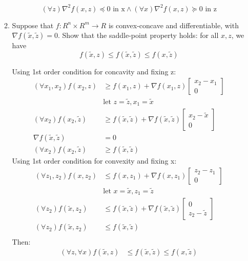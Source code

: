 \documentclass[12pt,letter]{article}
\begin{document}
\begin{enumerate}
\begin{enumerate}
    \[ (\forall z) \nabla^2 f(x,z) \preceq 0 \text{ in x} \wedge (\forall x) \nabla^2 f(x,z) \succeq 0 \text{ in z} \]
    
  \item Suppose that $f: R^n \times R^m \to R$ is convex-concave and differentiable, with $\nabla f(\tilde{x}, \tilde{z}) = 0$. Show that the saddle-point property holds: for all $x, z$, we have \[f(\tilde{x}, z) \leq f(\tilde{x}, \tilde{z}) \leq f(x, \tilde{z})\]

    Using 1st order condition for concavity and fixing z:
    \begin{align*}
      (\forall x_1, x_2) f(x_2,z) & \geq f(x_1,z) + \nabla f(x_1,z)\begin{bmatrix} x_2-x_1\\0\end{bmatrix}\\
                                  &\text{let } z=\tilde{z}, x_1 = \tilde{x}\\
      (\forall x_2) f(x_2,\tilde{z}) & \geq f(\tilde{x},\tilde{z}) + \nabla f(\tilde{x},\tilde{z})\begin{bmatrix} x_2-\tilde{x}\\0\end{bmatrix}\\
      \nabla f(\tilde{x},\tilde{z}) &= 0\\
      (\forall x_2) f(x_2,\tilde{z}) & \geq f(\tilde{x},\tilde{z})
    \end{align*}
    Using 1st order condition for convexity and fixing x:
    \begin{align*}
      (\forall z_1, z_2) f(x,z_2) & \leq f(x,z_1) + \nabla f(x,z_1)\begin{bmatrix} z_2-z_1\\0\end{bmatrix}\\
                                  &\text{let } x=\tilde{x}, z_1 = \tilde{z}\\
      (\forall z_2) f(\tilde{x},z_2) & \leq f(\tilde{x},\tilde{z}) + \nabla f(\tilde{x},\tilde{z})\begin{bmatrix} 0\\z_2-\tilde{z}\end{bmatrix}\\
      (\forall z_2) f(\tilde{x},z_2) & \leq f(\tilde{x},\tilde{z})\\
    \end{align*}
    Then:
    \begin{align*}
      (\forall z, \forall x) f(\tilde{x},z) & \leq f(\tilde{x},\tilde{z}) \leq f(x,\tilde{z})
    \end{align*}
    

\end{enumerate}
\end{enumerate}
\end{document}
